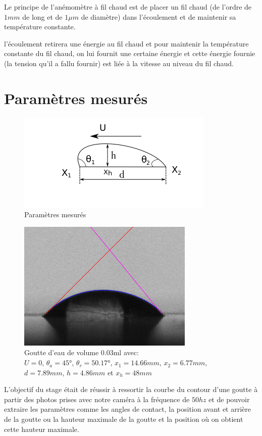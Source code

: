 Le principe de l'anémomètre à fil chaud est de placer un fil chaud (de l'ordre de $1mm$ de long et de $1\mu m$ de diamètre) dans l'écoulement et de maintenir sa température constante.

l'écoulement retirera une énergie au fil chaud et pour maintenir la température constante du fil chaud, on lui fournit une certaine énergie et cette énergie fournie (la tension qu'il a fallu fournir) est liée à la vitesse au niveau du fil chaud.


\section{Paramètres mesurés}

\begin{figure}[!ht]
	\centering
	\includegraphics[scale = 1]{./image/rrgou2.png}
	\caption{Paramètres mesurés}
\end{figure}
\begin{figure}[!ht]
	\centering
	\includegraphics[scale = 0.5]{./image/crop_tvitesse=28_volume=003.png}
	\caption{Goutte d'eau de volume $0.03$ml avec: \\$U = 0$, $\theta_{a} = \ang{45}$, $\theta_{r} = \ang{50.17}$, $x_{1} = 14.66mm$, $x_{2} = 6.77mm$,\\ $d = 7.89mm$, $h = 4.86mm$ et $x_{h} = 48mm$}
\end{figure}


L'objectif du stage était de réussir à ressortir la courbe du contour d'une goutte à partir des photos prises avec notre caméra à la fréquence de $50hz$ et de pouvoir extraire les paramètres comme les angles de contact, la position avant et arrière de la goutte ou la hauteur maximale de la goutte et la position où on obtient cette hauteur maximale.

